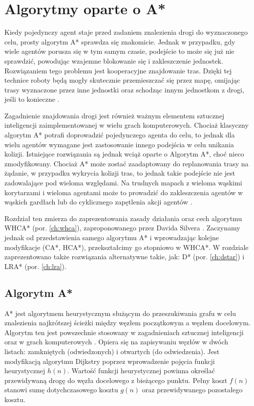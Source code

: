 \chapter{Algorytmy oparte o A*}
\label{ch:astar}

Kiedy pojedynczy agent staje przed zadaniem znalezienia drogi do wyznaczonego celu, prosty algorytm A* sprawdza się znakomicie. Jednak w przypadku, gdy wiele agentów porusza się w tym samym czasie, podejście to może się już nie sprawdzić, powodując wzajemne blokowanie się i zakleszczenie jednostek. Rozwiązaniem tego problemu jest kooperacyjne znajdowanie tras. Dzięki tej technice roboty będą mogły skutecznie przemieszczać się przez mapę, omijając trasy wyznaczone przez inne jednostki oraz schodząc innym jednostkom z drogi, jeśli to konieczne \cite{cooppath}.

Zagadnienie znajdowania drogi jest również ważnym elementem sztucznej inteligencji zaimplementowanej w wielu grach komputerowych. Chociaż klasyczny algorytm A* potrafi doprowadzić pojedynczego agenta do celu, to jednak dla wielu agentów wymagane jest zastosowanie innego podejścia w celu unikania kolizji. Istniejące rozwiązania są jednak wciąż oparte o Algorytm A*, choć nieco zmodyfikowany. Chociaż A* może zostać zaadaptowany do replanowania trasy na żądanie, w przypadku wykrycia kolizji tras, to jednak takie podejście nie jest zadowalające pod wieloma względami. Na trudnych mapach z wieloma wąskimi korytarzami i wieloma agentami może to prowadzić do zakleszczenia agentów w wąskich gardłach lub do cyklicznego zapętlenia akcji agentów \cite{cooppath}.

Rozdział ten zmierza do zaprezentowania zasady działania oraz cech algorytmu WHCA* (por. \ref{ch:whca}), zaproponowanego przez Davida Silvera \cite{cooppath}. Zaczynamy jednak od przedstawienia samego algorytmu A* i wprowadzając kolejne modyfikacje (CA*, HCA*), przekształcimy go stopniowo w WHCA*.
W rozdziale zaprezentowano także rozwiązania alternatywne takie, jak: D* (por. \ref{ch:dstar}) i LRA* (por. \ref{ch:lra}).

\section{Algorytm A*}
A* jest algorytmem heurystycznym służącym do przeszukiwania grafu w celu znalezienia najkrótszej ścieżki między węzłem początkowym a węzłem docelowym. Algorytm ten jest powszechnie stosowany w zagadnieniach sztucznej inteligencji oraz w grach komputerowych \cite{mit_astar}. Opiera się na zapisywaniu węzłów w dwóch listach: zamkniętych (odwiedzonych) i otwartych (do odwiedzenia). Jest modyfikacją algorytmu Dijkstry poprzez wprowadzenie pojęcia funkcji heurystycznej $h(n)$. Wartość funkcji heurystycznej powinna określać przewidywaną drogę do węzła docelowego z bieżącego punktu. Pełny koszt $f(n)$ stanowi sumę dotychczasowego kosztu $g(n)$ oraz przewidywanego pozostałego kosztu.

